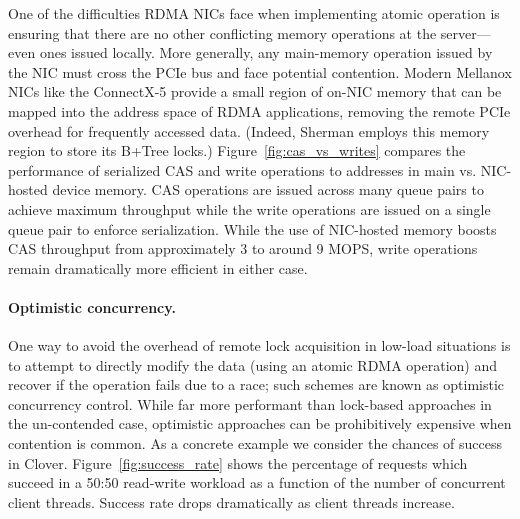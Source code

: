One of the difficulties RDMA NICs face when implementing atomic operation
is ensuring that there are no other conflicting memory operations at
the server---even ones issued locally.  More generally, any
main-memory operation issued by the NIC must cross the PCIe bus and
face potential contention.  Modern Mellanox NICs like the ConnectX-5
provide a small region of on-NIC memory that can be mapped into the
address space of RDMA applications,
removing the remote PCIe overhead for frequently accessed data.
(Indeed, Sherman employs this memory region to store its B+Tree locks.)
Figure~\ref{fig:cas_vs_writes} compares the performance of
serialized CAS and write operations to addresses in main vs.
NIC-hosted device memory. CAS operations are issued across many
queue pairs to achieve maximum throughput while the write operations are
issued on a single queue pair to enforce serialization.
While the use of NIC-hosted memory boosts CAS throughput
from approximately 3 to around 9 MOPS, write operations remain
dramatically more efficient in either case.

\paragraph{Optimistic concurrency.}
One way to avoid the overhead of remote lock acquisition in low-load
situations is to attempt to directly modify the data (using an
atomic RDMA operation) and recover if the operation fails due to a
race; such schemes are known as optimistic concurrency control.  While
far more performant than lock-based approaches in the un-contended
case, optimistic approaches can be prohibitively expensive when
contention is common.  As a concrete example we consider the chances
of success in Clover.
Figure~\ref{fig:success_rate} shows the percentage of requests
which succeed in a 50:50 read-write workload as a function of the number of
concurrent client threads. Success rate drops dramatically as client threads
increase.

